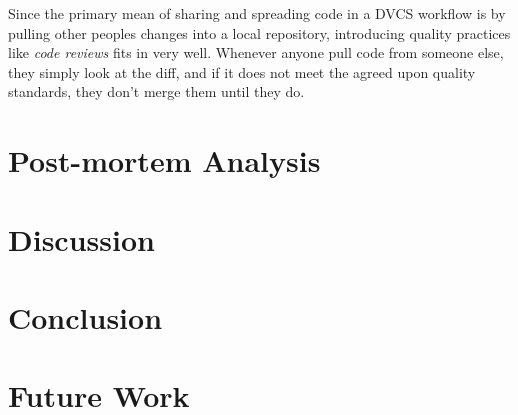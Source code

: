 \documentclass{llncs}
\begin{document}
Since the primary mean of sharing and spreading code in a DVCS
workflow is by pulling other peoples changes into a local repository,
introducing quality practices like \emph{code reviews} fits in very
well. Whenever anyone pull code from someone else, they simply look at
the diff, and if it does not meet the agreed upon quality standards,
they don't merge them until they do\cite{osullivan09}.

%
%
%

\section{Post-mortem Analysis}

\section{Discussion}

\section{Conclusion}

\section{Future Work}

 

\end{document}
